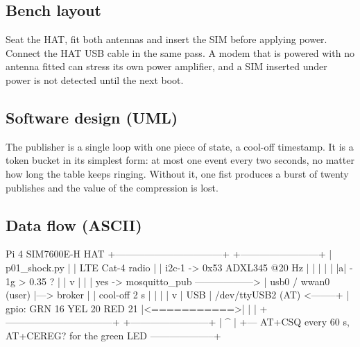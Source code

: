 \subsection*{Bench layout}


Seat the HAT, fit both antennas and insert the SIM before applying power. Connect the HAT USB cable in the same pass. A modem that is powered with no antenna fitted can stress its own power amplifier, and a SIM inserted under power is not detected until the next boot.

\subsection*{Software design (UML)}


The publisher is a single loop with one piece of state, a cool-off timestamp. It is a token bucket in its simplest form: at most one event every two seconds, no matter how long the table keeps ringing. Without it, one fist produces a burst of twenty publishes and the value of the compression is lost.

\subsection*{Data flow (ASCII)}

\begin{asciiart}
  Pi 4                                            SIM7600E-H HAT
  +---------------------------------+             +------------------------+
  | p01_shock.py                    |             |  LTE Cat-4 radio       |
  |   i2c-1 -> 0x53 ADXL345 @20 Hz  |             |    |                   |
  |   |a| - 1g > 0.35 ?             |             |    v                   |
  |   |  yes -> mosquitto_pub ------------------> | usb0 / wwan0  (user)   |---> broker
  |   |  cool-off 2 s               |             |                        |
  |   v                             |   USB       | /dev/ttyUSB2  (AT) <--------+
  | gpio: GRN 16  YEL 20  RED 21    |<===========>|                        |     |
  +---------------------------------+             +------------------------+     |
        ^                                                                        |
        +--- AT+CSQ every 60 s, AT+CEREG? for the green LED --------------------+
\end{asciiart}

